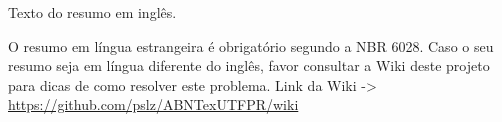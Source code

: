 Texto do resumo em inglês. 

O resumo em língua estrangeira é obrigatório segundo a NBR 6028. Caso o seu resumo seja em língua diferente do inglês, favor consultar a Wiki deste projeto para dicas de como resolver este problema. Link da Wiki ->  \url{https://github.com/pslz/ABNTexUTFPR/wiki}